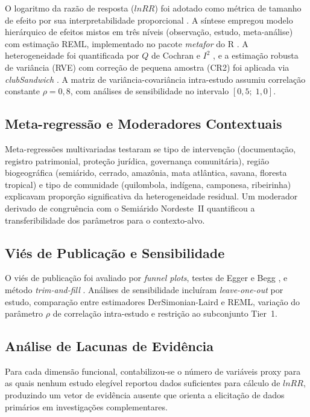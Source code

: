O logaritmo da razão de resposta ($lnRR$) foi adotado como métrica de tamanho de efeito por sua interpretabilidade proporcional \cite{Hedges1999}. A síntese empregou modelo hierárquico de efeitos mistos em três níveis (observação, estudo, meta-análise) com estimação REML, implementado no pacote \textit{metafor} do R \cite{Viechtbauer2010}. A heterogeneidade foi quantificada por $Q$ de Cochran e $I^2$ \cite{Higgins2003}, e a estimação robusta de variância (RVE) com correção de pequena amostra (CR2) foi aplicada via \textit{clubSandwich} \cite{Pustejovsky2022}. A matriz de variância-covariância intra-estudo assumiu correlação constante $\rho = 0{,}8$, com análises de sensibilidade no intervalo $[0{,}5;\; 1{,}0]$.

\subsection{Meta-regressão e Moderadores Contextuais}

Meta-regressões multivariadas testaram se tipo de intervenção (documentação, registro patrimonial, proteção jurídica, governança comunitária), região biogeográfica (semiárido, cerrado, amazônia, mata atlântica, savana, floresta tropical) e tipo de comunidade (quilombola, indígena, camponesa, ribeirinha) explicavam proporção significativa da heterogeneidade residual. Um moderador derivado de congruência com o Semiárido Nordeste~II quantificou a transferibilidade dos parâmetros para o contexto-alvo.

\subsection{Viés de Publicação e Sensibilidade}

O viés de publicação foi avaliado por \textit{funnel plots}, testes de Egger \cite{Sterne2005} e Begg \cite{Begg1994}, e método \textit{trim-and-fill} \cite{Duval2000}. Análises de sensibilidade incluíram \textit{leave-one-out} por estudo, comparação entre estimadores DerSimonian-Laird e REML, variação do parâmetro $\rho$ de correlação intra-estudo e restrição ao subconjunto Tier~1.

\subsection{Análise de Lacunas de Evidência}

Para cada dimensão funcional, contabilizou-se o número de variáveis proxy para as quais nenhum estudo elegível reportou dados suficientes para cálculo de $lnRR$, produzindo um vetor de evidência ausente que orienta a elicitação de dados primários em investigações complementares.

